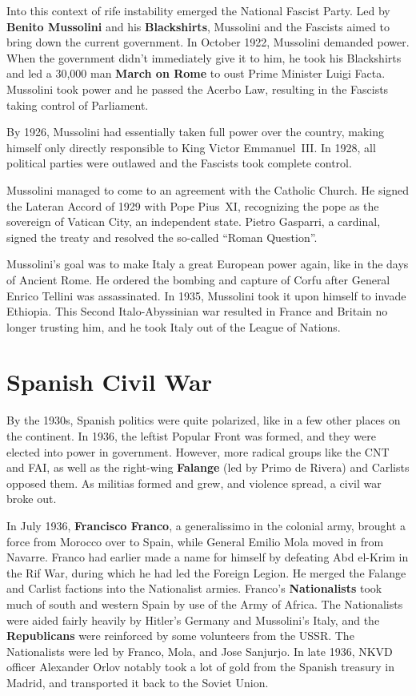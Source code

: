 Into this context of rife instability emerged the National Fascist Party.
Led by \textbf{Benito Mussolini} and his \textbf{Blackshirts},
Mussolini and the Fascists aimed to bring down the current government.
In October 1922, Mussolini demanded power.
When the government didn't immediately give it to him,
he took his Blackshirts and led a 30,000 man \textbf{March on Rome} to oust Prime Minister Luigi Facta.
Mussolini took power and he passed the Acerbo Law, resulting in the Fascists taking control of Parliament.

By 1926, Mussolini had essentially taken full power over the country,
making himself only directly responsible to King Victor Emmanuel~III\@.
In 1928, all political parties were outlawed and the Fascists took complete control.

Mussolini managed to come to an agreement with the Catholic Church.
He signed the Lateran Accord of 1929 with Pope Pius~XI,
recognizing the pope as the sovereign of Vatican City, an independent state.
Pietro Gasparri, a cardinal, signed the treaty and resolved the so-called ``Roman Question''.

Mussolini's goal was to make Italy a great European power again, like in the days of Ancient Rome.
He ordered the bombing and capture of Corfu after General Enrico Tellini was assassinated.
In 1935, Mussolini took it upon himself to invade Ethiopia.
This Second Italo-Abyssinian war resulted in France and Britain no longer trusting him,
and he took Italy out of the League of Nations.

\section{Spanish Civil War}

By the 1930s, Spanish politics were quite polarized, like in a few other places on the continent.
In 1936, the leftist Popular Front was formed, and they were elected into power in government.
However, more radical groups like the CNT and FAI,
as well as the right-wing \textbf{Falange} (led by Primo de Rivera) and Carlists opposed them.
As militias formed and grew, and violence spread, a civil war broke out.

In July 1936, \textbf{Francisco Franco}, a generalissimo in the colonial army,
brought a force from Morocco over to Spain, while General Emilio Mola moved in from Navarre.
Franco had earlier made a name for himself by defeating Abd el-Krim in the Rif War,
during which he had led the Foreign Legion.
He merged the Falange and Carlist factions into the Nationalist armies.
Franco's \textbf{Nationalists} took much of south and western Spain by use of the Army of Africa.
The Nationalists were aided fairly heavily by Hitler's Germany and Mussolini's Italy,
and the \textbf{Republicans} were reinforced by some volunteers from the USSR\@.
The Nationalists were led by Franco, Mola, and Jose Sanjurjo.
In late 1936, NKVD officer Alexander Orlov notably took a lot of gold from the Spanish treasury in Madrid,
and transported it back to the Soviet Union.

